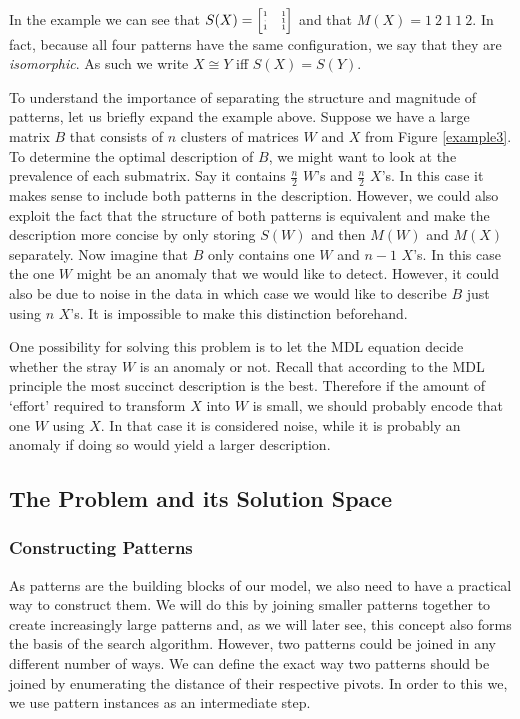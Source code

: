\documentclass{llncs}
\begin{document}
In the example we can see that $S(X)= \tiny\begin{bmatrix}1 & 1 \\[-.2em]\cdot & 1 \\[-.2em]1 & 1\end{bmatrix}$ and that $M(X)=1\ 2\ 1\ 1\ 2$. In fact, because all four patterns have the same configuration, we say that they are \emph{isomorphic}. As such we write $X \cong Y$ iff $S(X) = S(Y)$. 

To understand the importance of separating the structure and magnitude of patterns, let us briefly expand the example above. Suppose we have a large matrix $B$ that consists of $n$ clusters of matrices $W$ and $X$ from Figure \ref{example3}. To determine the optimal description of $B$, we might want to look at the prevalence of each submatrix. Say it contains $\frac{n}{2}$ $W$'s and $\frac{n}{2}$ $X$'s. In this case it makes sense to include both patterns in the description. However, we could also exploit the fact that the structure of both patterns is equivalent and make the description more concise by only storing $S(W)$ and then $M(W)$ and $M(X)$ separately. Now imagine that $B$ only contains one $W$ and $n-1$ $X$'s. In this case the one $W$ might be an anomaly that we would like to detect. However, it could also be due to noise in the data in which case we would like to describe $B$ just using $n$ $X$'s. It is impossible to make this distinction beforehand. 

One possibility for solving this problem is to let the MDL equation decide whether the stray $W$ is an anomaly or not. Recall that according to the MDL principle the most succinct description is the best. Therefore if the amount of `effort' required to transform $X$ into $W$ is small, we should probably encode that one $W$ using $X$. In that case it is considered noise, while it is probably an anomaly if doing so would yield a larger description.


\subsection{The Problem and its Solution Space}

\subsubsection{Constructing Patterns}

As patterns are the building blocks of our model, we also need to have a practical way to construct them. We will do this by joining smaller patterns together to create increasingly large patterns and, as we will later see, this concept also forms the basis of the search algorithm. However, two patterns could be joined in any different number of ways. We can define the exact way two patterns should be joined by enumerating the distance of their respective pivots. In order to this we, we use pattern instances as an intermediate step.
\end{document}
